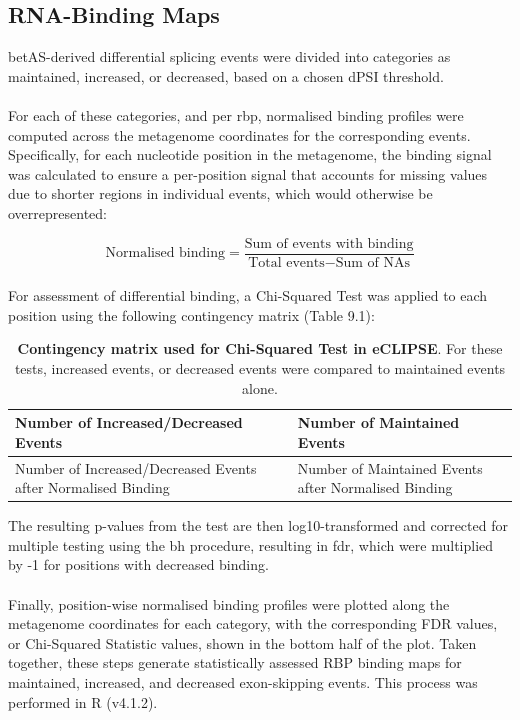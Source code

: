 \subsection{RNA-Binding Maps}

betAS-derived\cite{ascensao-ferreira_betas_2024} differential splicing events were divided into categories as maintained, increased, or decreased, based on a chosen dPSI threshold.
\\
\\ 
For each of these categories, and per \gls{rbp}, normalised binding profiles were computed across the metagenome coordinates for the corresponding events. Specifically, for each nucleotide position in the metagenome, the binding signal was calculated to ensure a per-position signal that accounts for missing values due to shorter regions in individual events, which would otherwise be overrepresented:

\begin{equation}
	\text{Normalised binding} =
	\frac{\text{Sum of events with binding}}{\text{Total events} - \text{Sum of NAs}}
\end{equation}
\\
\noindent
For assessment of differential binding, a Chi-Squared Test was applied to each position using the following contingency matrix (Table 9.1): 


\begin{table}[H]
	\centering
	\caption[Contingency matrix used for Chi-Squared Test in eCLIPSE]{\textbf{Contingency matrix used for Chi-Squared Test in eCLIPSE}. For these tests, increased events, or decreased events were compared to maintained events alone.}
	\scriptsize
	
	\begin{tabular}{|p{6cm}|p{6cm}|}
		\hline
		Number of Increased/Decreased Events & Number of Maintained Events \\
		\hline
		Number of Increased/Decreased Events after Normalised Binding &
		Number of Maintained Events after Normalised Binding \\
		\hline
	\end{tabular}
	
	\label{tab:event_counts}
\end{table}

\noindent
The resulting p-values from the test are then log10-transformed and corrected for multiple testing using the \gls{bh} procedure\cite{benjamini_controlling_1995}, resulting in \gls{fdr}, which were multiplied by -1 for positions with decreased binding.
\\
\\
Finally, position-wise normalised binding profiles were plotted along the metagenome coordinates for each category, with the corresponding FDR values, or Chi-Squared Statistic values, shown in the bottom half of the plot. Taken together, these steps generate statistically assessed RBP binding maps for maintained, increased, and decreased exon-skipping events. This process was performed in R (v4.1.2).

